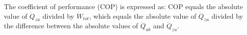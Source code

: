 The coefficient of performance (COP) is expressed as:  
COP equals the absolute value of \( \dot{Q}_{zu} \) divided by \( \dot{W}_{tot} \), which equals the absolute value of \( \dot{Q}_{zu} \) divided by the difference between the absolute values of \( \dot{Q}_{ab} \) and \( \dot{Q}_{zu} \).